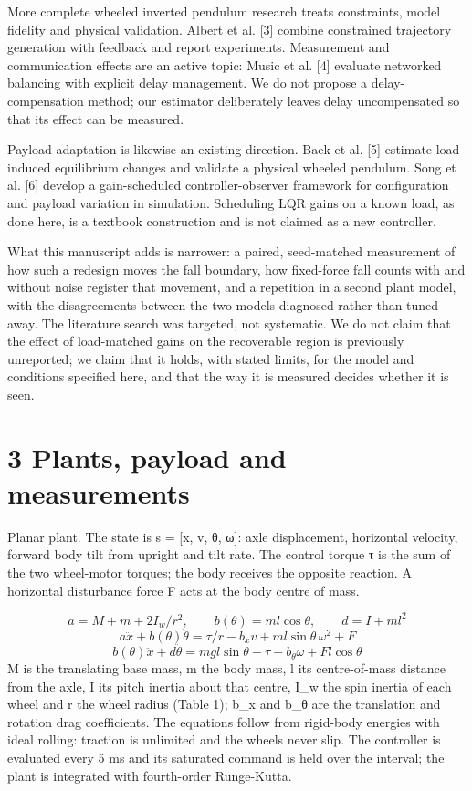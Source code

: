 \documentclass[11pt,a4paper]{article}
\begin{document}
More complete wheeled inverted pendulum research treats constraints, model fidelity and physical validation. Albert et al. [3] combine constrained trajectory generation with feedback and report experiments. Measurement and communication effects are an active topic: Music et al. [4] evaluate networked balancing with explicit delay management. We do not propose a delay-compensation method; our estimator deliberately leaves delay uncompensated so that its effect can be measured.

Payload adaptation is likewise an existing direction. Baek et al. [5] estimate load-induced equilibrium changes and validate a physical wheeled pendulum. Song et al. [6] develop a gain-scheduled controller-observer framework for configuration and payload variation in simulation. Scheduling LQR gains on a known load, as done here, is a textbook construction and is not claimed as a new controller.

What this manuscript adds is narrower: a paired, seed-matched measurement of how such a redesign moves the fall boundary, how fixed-force fall counts with and without noise register that movement, and a repetition in a second plant model, with the disagreements between the two models diagnosed rather than tuned away. The literature search was targeted, not systematic. We do not claim that the effect of load-matched gains on the recoverable region is previously unreported; we claim that it holds, with stated limits, for the model and conditions specified here, and that the way it is measured decides whether it is seen.

\section*{3 Plants, payload and measurements}
Planar plant. The state is s = [x, v, θ, ω]: axle displacement, horizontal velocity, forward body tilt from upright and tilt rate. The control torque τ is the sum of the two wheel-motor torques; the body receives the opposite reaction. A horizontal disturbance force F acts at the body centre of mass.

\begin{equation}a=M+m+2I_w/r^2,\qquad b(\theta)=ml\cos\theta,\qquad d=I+ml^2\end{equation}
\begin{equation}a\ddot{x}+b(\theta)\ddot{\theta}=\tau/r-b_xv+ml\sin\theta\,\omega^2+F\end{equation}
\begin{equation}b(\theta)\ddot{x}+d\ddot{\theta}=mgl\sin\theta-\tau-b_\theta\omega+Fl\cos\theta\end{equation}
M is the translating base mass, m the body mass, l its centre-of-mass distance from the axle, I its pitch inertia about that centre, I\_w the spin inertia of each wheel and r the wheel radius (Table 1); b\_x and b\_θ are the translation and rotation drag coefficients. The equations follow from rigid-body energies with ideal rolling: traction is unlimited and the wheels never slip. The controller is evaluated every 5 ms and its saturated command is held over the interval; the plant is integrated with fourth-order Runge-Kutta.
\end{document}
